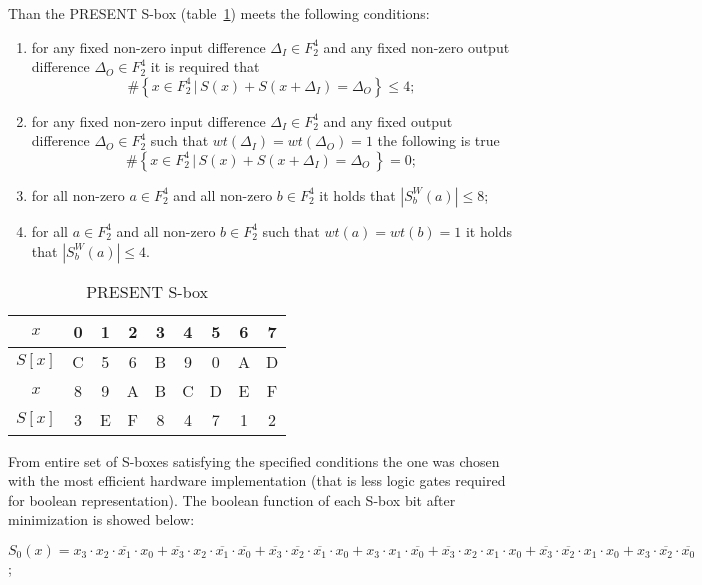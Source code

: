 Than the PRESENT S-box (table~\ref{tbl:sbox}) meets the following
conditions:
\begin{enumerate}
    \setlength{\itemsep}{0pt}%
        \setlength{\parskip}{0pt}%
    \item for any fixed non-zero input difference  
        $ \Delta_I \in F_2^4 $ and any fixed non-zero output difference 
        $ \Delta_O \in F_2^4 $ it is required that
        \begin{equation}
            \# \left\{ x \in F_2^4 \, | \, S(x) + S(x + \Delta_I) = \Delta_O \right\}
            \leq 4;
        \end{equation}
    \item for any fixed non-zero input difference
        $ \Delta_I \in F_2^4 $ and any fixed output difference
        $ \Delta_O \in F_2^4 $ such that
        $ wt(\Delta_I) = wt(\Delta_O) = 1 $ the following is true
        \begin{equation}
            \# \left\{ x \in F_2^4 \, | \, S(x) + S(x + \Delta_I) = \Delta_O\ \right\} = 0;
        \end{equation}
    \item for all non-zero $ a \in F_2^4 $ and all non-zero $ b \in F_2^4 $
        it holds that $ \left| S_b^W (a) \right| \leq 8 $;
    \item for all $ a \in F_2^4 $ and all non-zero $ b \in F_2^4 $ such that
        $ wt(a) = wt(b) = 1 $ it holds that $ \left| S_b^W (a) \right| \leq 4 $.
\end{enumerate}
\begin{table}[p]
    \caption{PRESENT S-box}
    \label{tbl:sbox}
    \small
    \centering
    \begin{tabular}{|c||c|c|c|c|c|c|c|c|}
        \hline
        $ x $ & 0 & 1 & 2 & 3 & 4 & 5 & 6 & 7 \\ \hline
        $S[x]$& C & 5 & 6 & B & 9 & 0 & A & D \\ \hline
        $x$ & 8 & 9 & A & B & C & D & E & F \\ \hline
        $S[x] $ & 3 & E & F & 8 & 4 & 7 & 1 & 2 \\ \hline
    \end{tabular}
\end{table}
From entire set of S-boxes satisfying the specified conditions the one was chosen
with the most efficient hardware implementation (that is less logic gates
required for boolean representation). The boolean function of each S-box bit
after minimization is showed below: 

\noindent
$ S_0(x) = x_3 \cdot x_2 \cdot \overline{x_1} \cdot x_0 +
\overline{x_3} \cdot x_2 \cdot \overline{x_1} \cdot \overline{x_0} + 
\overline{x_3} \cdot \overline{x_2} \cdot \overline{x_1} \cdot x_0 +
x_3 \cdot x_1 \cdot \overline{x_0} + 
\overline{x_3} \cdot x_2 \cdot x_1 \cdot x_0 + 
\overline{x_3} \cdot \overline{x_2} \cdot x_1 \cdot x_0 +
x_3 \cdot \overline{x_2} \cdot \overline{x_0} $; 

